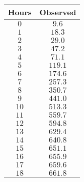 \begin{tabular}{cc} \toprule
Hours & Observed \\\midrule
$0$   & $9.6$    \\
$1$   & $18.3$   \\
$2$   & $29.0$   \\
$3$   & $47.2$   \\
$4$   & $71.1$   \\
$5$   & $119.1$  \\
$6$   & $174.6$  \\
$7$   & $257.3$  \\
$8$   & $350.7$  \\
$9$   & $441.0$  \\
$10$  & $513.3$  \\
$11$  & $559.7$  \\
$12$  & $594.8$  \\
$13$  & $629.4$  \\
$14$  & $640.8$  \\
$15$  & $651.1$  \\
$16$  & $655.9$  \\
$17$  & $659.6$  \\
$18$  & $661.8$  \\\bottomrule
\end{tabular}
